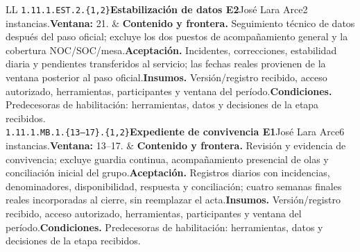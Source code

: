 \begin{longtable}{L{\tabcolsep\relax}L{\tabcolsep\relax}}
\texttt{1.\allowbreak{}11.\allowbreak{}1.\allowbreak{}EST.\allowbreak{}2.\allowbreak{}\{1,\allowbreak{}2\}}\newline{}\textbf{Estabilización de datos E2}\newline{}José Lara Arce\newline{}2 instancias.\newline{}\textbf{Ventana:} 21. & \textbf{Contenido y frontera.} Seguimiento técnico de datos después del paso oficial; excluye los dos puestos de acompañamiento general y la cobertura NOC/SOC/mesa.\newline{}\textbf{Aceptación.} Incidentes, correcciones, estabilidad diaria y pendientes transferidos al servicio; las fechas reales provienen de la ventana posterior al paso oficial.\newline{}\textbf{Insumos.} Versión/registro recibido, acceso autorizado, herramientas, participantes y ventana del período.\newline{}\textbf{Condiciones.} Predecesoras de habilitación: herramientas, datos y decisiones de la etapa recibidos.\\\hline
\texttt{1.\allowbreak{}11.\allowbreak{}1.\allowbreak{}MB.\allowbreak{}1.\allowbreak{}\{13--17\}.\allowbreak{}\{1,\allowbreak{}2\}}\newline{}\textbf{Expediente de convivencia E1}\newline{}José Lara Arce\newline{}6 instancias.\newline{}\textbf{Ventana:} 13--17. & \textbf{Contenido y frontera.} Revisión y evidencia de convivencia; excluye guardia continua, acompañamiento presencial de olas y conciliación inicial del grupo.\newline{}\textbf{Aceptación.} Registros diarios con incidencias, denominadores, disponibilidad, respuesta y conciliación; cuatro semanas finales reales incorporadas al cierre, sin reemplazar el acta.\newline{}\textbf{Insumos.} Versión/registro recibido, acceso autorizado, herramientas, participantes y ventana del período.\newline{}\textbf{Condiciones.} Predecesoras de habilitación: herramientas, datos y decisiones de la etapa recibidos.\\\hline

\end{longtable}
